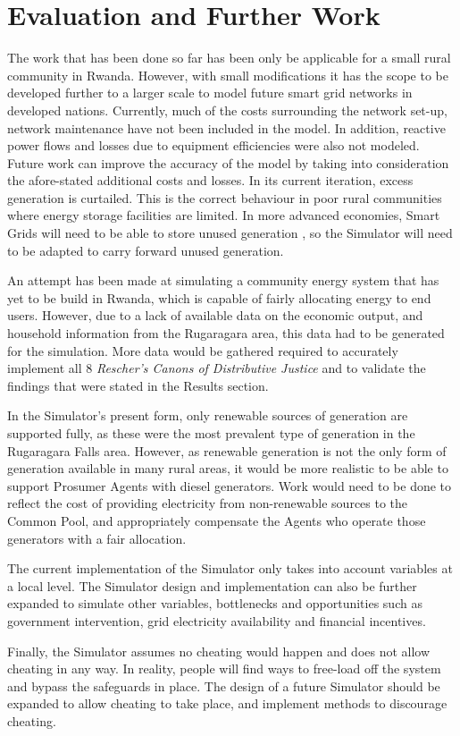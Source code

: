 \chapter{Evaluation and Further Work}
\label{Further Work}

The work that has been done so far has been only be applicable for a small rural community in Rwanda. However, with small modifications it has the scope to be developed further to a larger scale to model future smart grid networks in developed nations. Currently, much of the costs surrounding the network set-up, network maintenance have not been included in the model. In addition, reactive power flows and losses due to equipment efficiencies were also not modeled. Future work can improve the accuracy of the model by taking into consideration the afore-stated additional costs and losses. In its current iteration, excess generation is curtailed. This is the correct behaviour in poor rural communities where energy storage facilities are limited. In more advanced economies, Smart Grids will need to be able to store unused generation \cite{IEEE-SmartGrid:2015}, so the Simulator will need to be adapted to carry forward unused generation.

An attempt has been made at simulating a community energy system that has yet to be build in Rwanda, which is capable of fairly allocating energy to end users. However, due to a lack of available data on the economic output, and household information from the Rugaragara area, this data had to be generated for the simulation. More data would be gathered required to accurately implement all 8 \textit{Rescher's Canons of Distributive Justice} and to validate the findings that were stated in the Results section.

In the Simulator's present form, only renewable sources of generation are supported fully, as these were the most prevalent type of generation in the Rugaragara Falls area. However, as renewable generation is not the only form of generation available in many rural areas, it would be more realistic to be able to support Prosumer Agents with diesel generators. Work would need to be done to reflect the cost of providing electricity from non-renewable sources to the Common Pool, and appropriately compensate the Agents who operate those generators with a fair allocation.

The current implementation of the Simulator only takes into account variables at a local level. The Simulator design and implementation can also be further expanded to simulate other variables, bottlenecks and opportunities such as government intervention, grid electricity availability and financial incentives. 

Finally, the Simulator assumes no cheating would happen and does not allow cheating in any way. In reality, people will find ways to free-load off the system and bypass the safeguards in place. The design of a future Simulator should be expanded to allow cheating to take place, and implement methods to discourage cheating.

